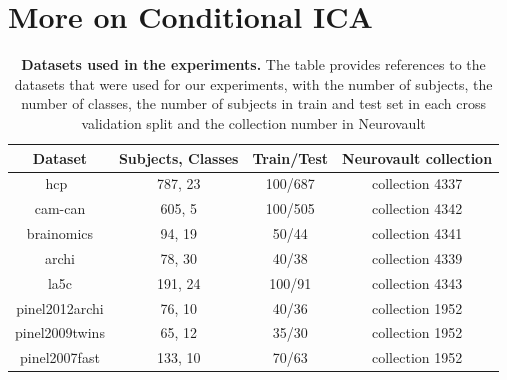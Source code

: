 \section{More on Conditional ICA}
\begin{table}
\begin{center}
\begin{tabular}{c|c|c|c}
\hline
Dataset & Subjects, Classes  & Train/Test & Neurovault collection 
\\ \hline
hcp~\cite{van2013wu}  & 787, 23 & 100/687  & collection 4337
\\
cam-can \cite{shafto2014cambridge}  & 605, 5 & 100/505  & collection 4342
\\
brainomics \cite{orfanos2017brainomics}  & 94, 19 & 50/44  &  collection 4341
\\
archi \cite{pinel2019functional}  & 78, 30 & 40/38  & collection 4339
\\
la5c \cite{poldrack2016phenome}  & 191, 24 & 100/91  & collection 4343
\\
pinel2012archi \cite{pinel2019functional} & 76, 10 & 40/36  & collection 1952
\\
pinel2009twins \cite{pinel2013genetic}  & 65, 12 & 35/30  & collection 1952
\\
pinel2007fast \cite{pinel2007fast} & 133, 10 & 70/63  & collection 1952
\\\hline\hline
\end{tabular}
\end{center}
\caption{\textbf{Datasets used in the experiments.} The table provides
  references to the datasets that were used for our experiments, with
  the number of subjects, the number of classes, the number of subjects in train
  and test set in each cross validation split and the collection number in Neurovault}
  \label{app:dataset:tab}
\end{table}

